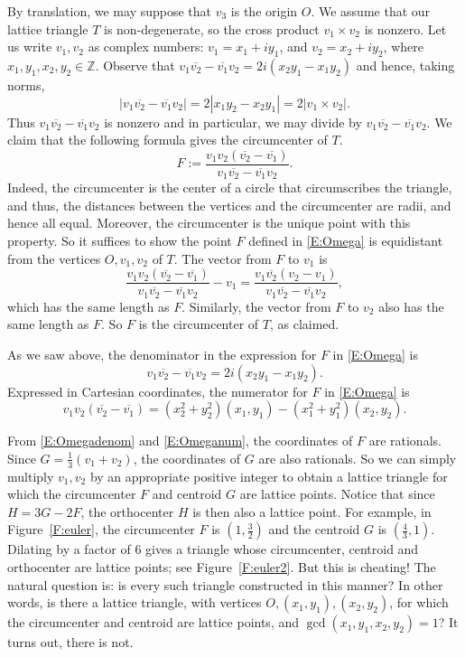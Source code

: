 \documentclass[10pt,preprint]{amsart}
\def\Z{\mathbb Z}
\theoremstyle{plain}
\theoremstyle{definition}
\theoremstyle{remark}
\begin{document}
By translation, we may suppose that $v_3$ is the origin $O$. 
We assume that our lattice triangle $T$ is non-degenerate, so the cross product $v_1\times v_2$ is nonzero. 
Let us write $v_1,v_2$ as complex numbers: $v_1 = x_1 + iy_1$, and $v_2 = x_2 + iy_2$, where $x_1,y_1,x_2,y_2 \in\Z$.
Observe that $v_1\overline{v_2}- \overline{v_1} v_2=2i(x_2 y_1 - x_1 y_2) $ and hence, taking norms,
\[
|v_1\overline{v_2}- \overline{v_1} v_2|=2|x_1 y_2-x_2 y_1 | = 2|v_1\times v_2|.
\]
Thus $v_1\overline{v_2}- \overline{v_1} v_2$ is nonzero and in particular, we may divide by $v_1\overline{v_2}- \overline{v_1} v_2$. 
We claim that the following formula gives the circumcenter of $T$.
\begin{equation}\label{E:Omega}
F:=\frac{v_1v_2(\overline{v_2}-\overline{v_1})}{v_1\overline{v_2}-\overline{v_1} v_2}.
\end{equation}
Indeed, the circumcenter is the center of a circle that
circumscribes the triangle, and thus, the distances between the vertices and
the circumcenter are radii, and hence all equal. Moreover, the circumcenter is the unique point with this property. So it suffices to show the point $F$ defined in \eqref{E:Omega} is equidistant from the vertices $O,v_1,v_2$ of $T$. 
The vector from $F$ to $v_1$ is
\[
\frac{v_1v_2(\overline{v_2}-\overline{v_1})}{v_1\overline{v_2}-\overline{v_1} v_2}-v_1=\frac{v_1\overline{v_2}(v_2-  v_1)}{v_1\overline{v_2}-\overline{v_1} v_2},
\]
which has the same length as $F$. Similarly, the vector from $F$ to $v_2$ also has the same length as $F$. So $F$ is the circumcenter of $T$, as claimed. 

As we saw above, the denominator in the expression for $F$ in \eqref{E:Omega} is
\begin{equation}\label{E:Omegadenom}
v_1\overline{v_2}-\overline{v_1} v_2=2i(x_2 y_1 - x_1 y_2).
\end{equation}
Expressed in Cartesian coordinates, the numerator for $F$ in \eqref{E:Omega} is
\begin{equation}\label{E:Omeganum}
v_1v_2(\overline{v_2}-\overline{v_1})=(x_2^2+y_2^2)(x_1,y_1) - (x_1^2+y_1^2)(x_2,y_2).
\end{equation}

From \eqref{E:Omegadenom} and \eqref{E:Omeganum}, the coordinates of $F$ are rationals. Since $G=\frac13(v_1+v_2)$, the coordinates of $G$ are also rationals. So we can simply multiply $v_1,v_2$ by an appropriate positive integer to obtain a lattice triangle for which the circumcenter $F$ and centroid $G$ are lattice points. Notice that since $H=3G-2F$, the orthocenter $H$ is then also a lattice point. For example, in Figure~\ref{F:euler}, the circumcenter $F$ is $(1,\frac32)$ and the centroid $G$ is $(\frac43,1)$. Dilating by a factor of $6$ gives a triangle whose circumcenter, centroid and orthocenter are lattice points; see Figure~\ref{F:euler2}. But this is cheating! The natural question is: is every such triangle constructed in this manner? In other words, is there a lattice triangle, with vertices $O,(x_1,y_1),(x_2,y_2)$, for which the circumcenter and centroid are lattice points, and $\gcd(x_1,y_1,x_2,y_2)=1$? It turns out, there is not.
\end{document}
